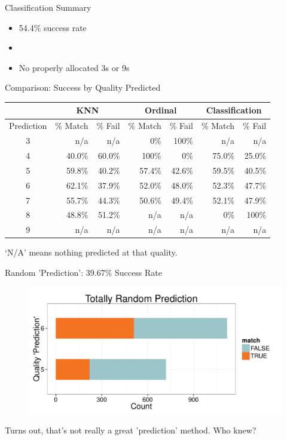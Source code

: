 \documentclass{beamer}
\begin{document}
\begin{frame}{Classification Summary}
	\begin{itemize}
	\item 54.4\% success rate
	\item[]
	\item No properly allocated 3s or 9s
	\end{itemize}
\end{frame}

\begin{frame}{Comparison: Success by Quality Predicted}
	\begin{center}
	
	\begin{tabular}{c | r r | r r | r r|}
		           & \multicolumn{2}{c|}{KNN} & \multicolumn{2}{c|}{Ordinal} & \multicolumn{2}{c|}{Classification}          \\ \hline
		Prediction & \% Match & \% Fail       & \% Match & \% Fail       & \% Match & \% Fail       \\ \hline
		    3      & n/a      & n/a           & 0\%      & 100\%         & n/a      & n/a           \\
		    4      & 40.0\%   & 60.0\%        & 100\%    & 0\%           & 75.0\%   & 25.0\%        \\
		    5      & 59.8\%   & 40.2\%        & 57.4\%   & 42.6\%        & 59.5\%   & 40.5\%        \\
		    6      & 62.1\%   & 37.9\%        & 52.0\%   & 48.0\%        & 52.3\%   & 47.7\%        \\
		    7      & 55.7\%   & 44.3\%        & 50.6\%   & 49.4\%        & 52.1\%   & 47.9\%        \\
		    8      & 48.8\%   & 51.2\%        & n/a      & n/a           & 0\%      & 100\%         \\
		    9      & n/a      & n/a           & n/a      & n/a           & n/a      & n/a           \end{tabular}
	
	\end{center}
	`N/A' means nothing predicted at that quality.
\end{frame}

\begin{frame}{Random 'Prediction': 39.67\% Success Rate}
	\begin{figure}
		\centering
		\includegraphics[width=\textwidth]{../images/RandomPrediction.pdf}
	\end{figure}
	Turns out, that's not really a great 'prediction' method. Who knew?
\end{frame}
\end{document}
